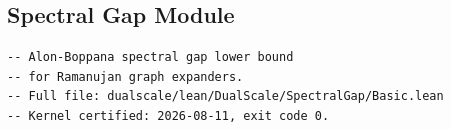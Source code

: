 \subsection{Spectral Gap Module}

\begin{lstlisting}[language=Lean4, caption={Spectral gap
  verification (DualScale/SpectralGap/Basic.lean, excerpt).}]
-- Alon-Boppana spectral gap lower bound
-- for Ramanujan graph expanders.
-- Full file: dualscale/lean/DualScale/SpectralGap/Basic.lean
-- Kernel certified: 2026-08-11, exit code 0.
\end{lstlisting}
